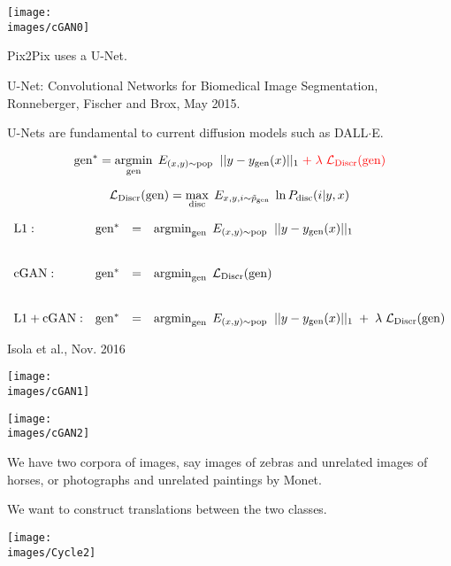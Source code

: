 {\centerline{\texttt{[image: \\images/cGAN0]}}


Pix2Pix uses a U-Net.

\vfill
U-Net: Convolutional Networks for Biomedical Image Segmentation, Ronneberger, Fischer and Brox, May 2015.

\vfill
U-Nets are fundamental to current diffusion models such as DALL$\cdot$E.


$$\mathrm{gen}^* = \operatorname*{argmin}_{\mathrm{gen}}\;E_{(x,y) \sim \mathrm{pop}}\;\; ||y- y_{\mathrm{gen}}(x)||_1\; {\color{red} + \; \lambda\; {\cal L}_{\mathrm{Discr}}(\mathrm{gen})}$$

\vfill
$${\cal L}_\mathrm{Discr}(\mathrm{gen}) = \max_{\mathrm{disc}} \;E_{x,y,i \sim \tilde{p}_{\mathrm{gen}}}\; \ln P_{\mathrm{disc}}(i|y,x)$$


{\huge
$$\begin{array}{lrcl}
\mathrm{L1:} & \mathrm{gen}^* & = & \operatorname*{argmin}_{\mathrm{gen}}\;E_{(x,y) \sim \mathrm{pop}}\;\; ||y - y_{\mathrm{gen}}(x)||_1 \\
\\
\\
\mathrm{cGAN:} & \mathrm{gen}^* & = & \operatorname*{argmin}_{\mathrm{gen}}\;{\cal L}_{\mathrm{Discr}}(\mathrm{gen}) \\
\\
\\
\mathrm{L1 + cGAN:} & \mathrm{gen}^* & = & \operatorname*{argmin}_{\mathrm{gen}}\;E_{(x,y) \sim \mathrm{pop}}\;\; ||y - y_{\mathrm{gen}}(x)||_1\; +\; \lambda\; {\cal L}_\mathrm{Discr}(\mathrm{gen})
\end{array}$$
}


{Isola et al., Nov. 2016}

\centerline{\texttt{[image: \\images/cGAN1]}}


\centerline{\texttt{[image: \\images/cGAN2]}}


We have two corpora of images, say images of zebras and unrelated images of horses, or photographs and unrelated paintings by Monet.

\vfill
We want to construct translations between the two classes.

\centerline{\texttt{[image: \\images/Cycle2]}}

}
